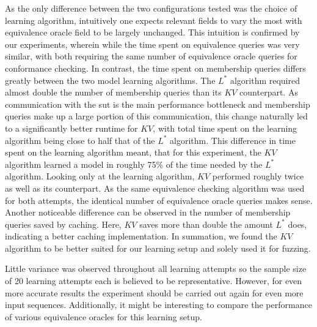 As the only difference between the two configurations tested was the choice of learning algorithm, intuitively one expects relevant fields to vary the most with equivalence oracle field to be largely unchanged. This intuition is confirmed by our experiments, wherein while the time spent on equivalence queries was very similar, with both requiring the same number of equivalence oracle queries for conformance checking. In contrast, the time spent on membership queries differs greatly between the two model learning algorithms. The $L^*$ algorithm required almost double the number of membership queries than its $KV$ counterpart. As communication with the \ac{sut} is the main performance bottleneck and membership queries make up a large portion of this communication, this change naturally led to a significantly better runtime for $KV$, with total time spent on the learning algorithm being close to half that of the $L^*$ algorithm. This difference in time spent on the learning algorithm meant, that for this experiment, the $KV$ algorithm learned a model in roughly 75\% of the time needed by the $L^*$ algorithm. Looking only at the learning algorithm, $KV$ performed roughly twice as well as its counterpart. As the same equivalence checking algorithm was used for both attempts, the identical number of equivalence oracle queries makes sense. Another noticeable difference can be observed in the number of membership queries saved by caching. Here, $KV$ saves more than double the amount $L^*$ does, indicating a better caching implementation. In summation, we found the $KV$ algorithm to be better suited for our learning setup and solely used it for fuzzing. 

Little variance was observed throughout all learning attempts so the sample size of 20 learning attempts each is believed to be representative. However, for even more accurate results the experiment should be carried out again for even more input sequences. Additionally, it might be interesting to compare the performance of various equivalence oracles for this learning setup.

